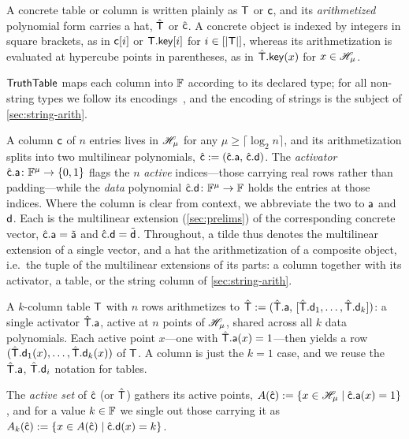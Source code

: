 A concrete table or column is written plainly as $\mathsf{T}$ or $\mathsf{c}$, and its \emph{arithmetized} polynomial form carries a hat, $\hat{\mathsf{T}}$ or $\hat{\mathsf{c}}$. A concrete object is indexed by integers in square brackets, as in $\mathsf{c}[i]$ or $\mathsf{T}.\mathsf{key}[i]$ for $i \in [|\mathsf{T}|]$, whereas its arithmetization is evaluated at hypercube points in parentheses, as in $\hat{\mathsf{T}}.\mathsf{key}(x)$ for $x \in \mathscr{H}_{\mu}$.

$\mathsf{TruthTable}$ maps each column into $\mathbb{F}$ according to its declared type; for all non-string types we follow its encodings~\cite{cryptoeprint:2026/1260}, and the encoding of strings is the subject of \cref{sec:string-arith}.

A column $\mathsf{c}$ of $n$ entries lives in $\mathscr{H}_{\mu}$ for any $\mu \ge \lceil \log_2 n \rceil$, and its arithmetization splits into two multilinear polynomials, $\hat{\mathsf{c}} := (\hat{\mathsf{c}}.\mathsf{a},\, \hat{\mathsf{c}}.\mathsf{d})$. The \emph{activator} $\hat{\mathsf{c}}.\mathsf{a} \colon \mathbb{F}^{\mu} \to \{0,1\}$ flags the $n$ \emph{active} indices---those carrying real rows rather than padding---while the \emph{data} polynomial $\hat{\mathsf{c}}.\mathsf{d} \colon \mathbb{F}^{\mu} \to \mathbb{F}$ holds the entries at those indices. Where the column is clear from context, we abbreviate the two to $\mathsf{a}$ and $\mathsf{d}$. Each is the multilinear extension (\cref{sec:prelims}) of the corresponding concrete vector, $\hat{\mathsf{c}}.\mathsf{a} = \tilde{\mathsf{a}}$ and $\hat{\mathsf{c}}.\mathsf{d} = \tilde{\mathsf{d}}$. Throughout, a tilde thus denotes the multilinear extension of a single vector, and a hat the arithmetization of a composite object, i.e.\ the tuple of the multilinear extensions of its parts: a column together with its activator, a table, or the string column of \cref{sec:string-arith}.

A $k$-column table $\mathsf{T}$ with $n$ rows arithmetizes to $\hat{\mathsf{T}} := (\hat{\mathsf{T}}.\mathsf{a},\, [\hat{\mathsf{T}}.\mathsf{d}_1, \dots, \hat{\mathsf{T}}.\mathsf{d}_k])$: a single activator $\hat{\mathsf{T}}.\mathsf{a}$, active at $n$ points of $\mathscr{H}_{\mu}$, shared across all $k$ data polynomials. Each active point $x$---one with $\hat{\mathsf{T}}.\mathsf{a}(x) = 1$---then yields a row $(\hat{\mathsf{T}}.\mathsf{d}_1(x),\dots,\hat{\mathsf{T}}.\mathsf{d}_k(x))$ of $\mathsf{T}$. A column is just the $k=1$ case, and we reuse the $\hat{\mathsf{T}}.\mathsf{a}$, $\hat{\mathsf{T}}.\mathsf{d}_i$ notation for tables.

The \emph{active set} of $\hat{\mathsf{c}}$ (or $\hat{\mathsf{T}}$) gathers its active points, $A(\hat{\mathsf{c}}) := \{x \in \mathscr{H}_{\mu} \mid \hat{\mathsf{c}}.\mathsf{a}(x) = 1\}$, and for a value $k \in \mathbb{F}$ we single out those carrying it as $A_k(\hat{\mathsf{c}}) := \{x \in A(\hat{\mathsf{c}}) \mid \hat{\mathsf{c}}.\mathsf{d}(x) = k\}$.

